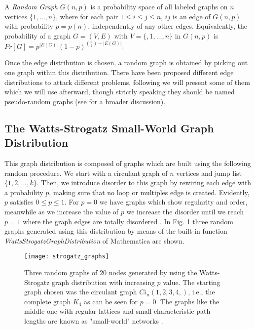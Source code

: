 \begin{defn}
	A \textit{Random Graph} $G(n,p)$ is a probability space of all labeled graphs on $n$ vertices $\{1,...,n\}$, where for each pair $1 \leq i \leq j \leq n$, $ij$ is an edge of $G(n,p)$ with probability $p=p(n)$, independently of any other edges. Equivalently, the probability of a graph $G=(V,E)$ with $V=\{,1,...,n\}$ in $G(n,p)$ is $Pr[G]=p^{|E(G)|}(1-p)^{\binom{n}{2}-|E(G)|}$.
\end{defn}

Once the edge distribution is chosen, a random graph is obtained by picking out one graph within this distribution.
There have been proposed different edge distributions to attack different problems, following we will present some of them which we will use afterward, though strictly speaking they should be named pseudo-random graphs (see \cite{random_graphs} for a broader discussion).


\subsection{The Watts-Strogatz Small-World Graph Distribution}
\label{Watts-Strogatz}
This graph distribution is composed of graphs which are built using the following random procedure. We start with a circulant graph of $n$ vertices and jump list $\{1,2,...,k\}$. Then, we introduce disorder to this graph by rewiring each edge with a probability $p$, making sure that no loop or multiples edge is created. Evidently, $p$ satisfies $0 \leq p \leq 1$. For $p=0$ we have graphs which show regularity and order, meanwhile as we increase the value of $p$ we increase the disorder until we reach $p=1$ where the graph edges are totally disordered \cite{strogatz}. In Fig. \ref{fig:strogatz_graphs} three random graphs generated using this distribution by means of the built-in function \textit{WattsStrogatzGraphDistribution} of Mathematica are shown.

\begin{figure}[h]
\centering
\texttt{[image: strogatz\_graphs]}
\caption[Three random graphs generated by using the Watts-Strogatz graph distribution.]{Three random graphs of $20$ nodes generated by using the Watts-Strogatz graph distribution with increasing $p$ value. The starting graph chosen was the circulant graph $Ci_{n} (1,2,3,4,)$, i.e., the complete graph $K_{4}$ as can be seen for $p=0$. The graphs like the middle one with regular lattices and small characteristic path lengths are known as "small-world" networks \cite{strogatz}.}
\label{fig:strogatz_graphs}
\end{figure}

